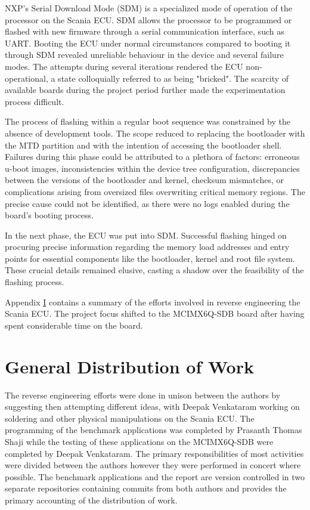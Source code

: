 NXP's Serial Download Mode (SDM) is a specialized mode of operation of the processor on the Scania ECU. SDM allows the processor to be programmed or flashed with new firmware through a serial communication interface, such as UART. Booting the ECU under normal circumstances compared to booting it through SDM revealed unreliable behaviour in the device and several failure modes. The attempts during several iterations rendered the ECU non-operational, a state colloquially referred to as being "bricked". The scarcity of available boards during the project period further made the experimentation process difficult.

The process of flashing within a regular boot sequence was constrained by the absence of development tools. The scope reduced to replacing the bootloader with the MTD partition and with the intention of accessing the bootloader shell. Failures during this phase could be attributed to a plethora of factors: erroneous u-boot images, inconsistencies within the device tree configuration, discrepancies between the versions of the bootloader and kernel, checksum mismatches, or complications arising from oversized files overwriting critical memory regions. The precise cause could not be identified, as there were no logs enabled during the board's booting process.

In the next phase, the ECU was put into SDM. Successful flashing hinged on procuring precise information regarding the memory load addresses and entry points for essential components like the bootloader, kernel and root file system. These crucial details remained elusive, casting a shadow over the feasibility of the flashing process.

Appendix \hyperref[rtc-c300]{I} contains a summary of the efforts involved in reverse engineering the Scania ECU. The project focus shifted to the MCIMX6Q-SDB board after having spent considerable time on the board.

\section{General Distribution of Work}

The reverse engineering efforts were done in unison between the authors by suggesting then attempting different ideas, with Deepak Venkataram working on soldering and other physical manipulations on the Scania ECU. The programming of the benchmark applications was completed by Prasanth Thomas Shaji while the testing of these applications on the MCIMX6Q-SDB were completed by Deepak Venkataram. The primary responsibilities of most activities were divided between the authors however they were performed in concert where possible. The benchmark applications and the report are version controlled in two separate repositories containing commits from both authors and provides the primary accounting of the distribution of work.

